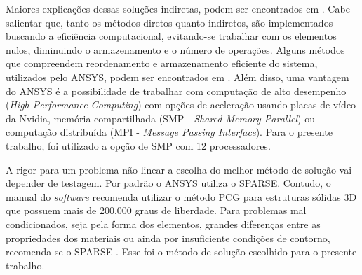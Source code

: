 Maiores explicações dessas soluções indiretas, podem ser encontrados em . Cabe salientar que, tanto os métodos diretos quanto indiretos, são implementados buscando a eficiência computacional, evitando-se trabalhar com os elementos nulos, diminuindo o armazenamento e o número de operações. Alguns métodos que compreendem reordenamento e armazenamento eficiente do sistema, utilizados pelo ANSYS, podem ser encontrados em . Além disso, uma vantagem do ANSYS é a possibilidade de trabalhar com computação de alto desempenho (\textit{High Performance Computing}) com opções de aceleração usando placas de vídeo da Nvidia, memória compartilhada (SMP - \textit{Shared-Memory Parallel}) ou computação distribuída (MPI - \textit{Message Passing Interface}). Para o presente trabalho, foi utilizado a opção de SMP com 12 processadores.

A rigor para um problema não linear a escolha do melhor método de solução vai depender de testagem. Por padrão o ANSYS utiliza o SPARSE. Contudo, o manual do \textit{software} recomenda utilizar o método PCG para estruturas sólidas 3D que possuem mais de 200.000 graus de liberdade. Para problemas mal condicionados, seja pela forma dos elementos, grandes diferenças entre as propriedades dos materiais ou ainda por insuficiente condições de contorno, recomenda-se o SPARSE \cite[p. 242]{ANSYS2018b}. Esse foi o método de solução escolhido para o presente trabalho.

